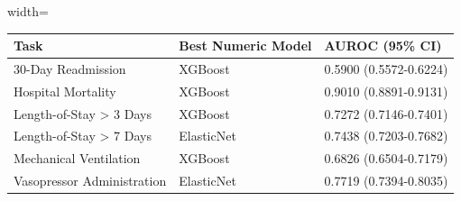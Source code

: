 \documentclass[border=0pt]{standalone}
\begin{document}
\begin{adjustbox}{width=\textwidth}
\begin{tabular}{lll}
\toprule
Task & Best Numeric Model & AUROC (95\% CI) \\
\midrule
30-Day Readmission & XGBoost & 0.5900 (0.5572-0.6224) \\
Hospital Mortality & XGBoost & 0.9010 (0.8891-0.9131) \\
Length-of-Stay \textgreater{} 3 Days & XGBoost & 0.7272 (0.7146-0.7401) \\
Length-of-Stay \textgreater{} 7 Days & ElasticNet & 0.7438 (0.7203-0.7682) \\
Mechanical Ventilation & XGBoost & 0.6826 (0.6504-0.7179) \\
Vasopressor Administration & ElasticNet & 0.7719 (0.7394-0.8035) \\
\bottomrule
\end{tabular}

\end{adjustbox}
\end{document}
